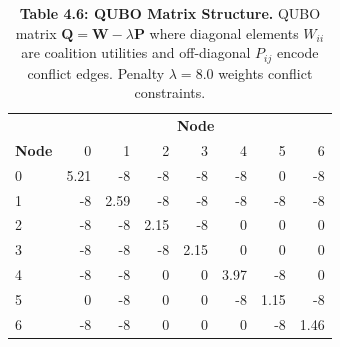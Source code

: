\begin{table}[H]
\centering
\caption{\textbf{Table 4.6: QUBO Matrix Structure.} QUBO matrix $\mathbf{Q} = \mathbf{W} - \lambda \mathbf{P}$ where diagonal elements $W_{ii}$ are coalition utilities and off-diagonal $P_{ij}$ encode conflict edges. Penalty $\lambda = 8.0$ weights conflict constraints.}
\label{tab:4-6}
\small
\begin{tabular}{l|rrrrrrr}
\toprule
 & \multicolumn{7}{c}{\textbf{Node}} \\
\textbf{Node} & 0 & 1 & 2 & 3 & 4 & 5 & 6 \\
\midrule
\rowcolor{gray!15}
0 & 5.21 & -8 & -8 & -8 & -8 & 0 & -8 \\
1 & -8 & 2.59 & -8 & -8 & -8 & -8 & -8 \\
\rowcolor{gray!15}
2 & -8 & -8 & 2.15 & -8 & 0 & 0 & 0 \\
3 & -8 & -8 & -8 & 2.15 & 0 & 0 & 0 \\
\rowcolor{gray!15}
4 & -8 & -8 & 0 & 0 & 3.97 & -8 & 0 \\
5 & 0 & -8 & 0 & 0 & -8 & 1.15 & -8 \\
\rowcolor{gray!15}
6 & -8 & -8 & 0 & 0 & 0 & -8 & 1.46 \\
\bottomrule
\end{tabular}
\end{table}
